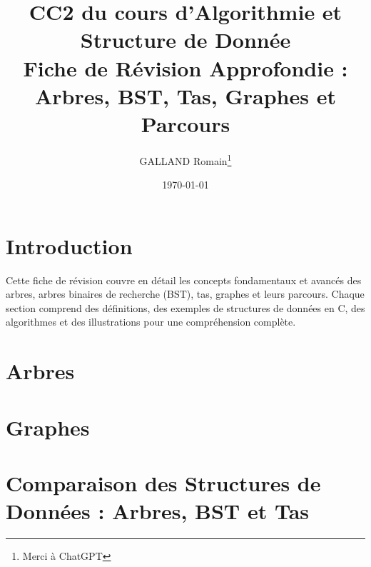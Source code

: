 \documentclass{article}
\title{CC2 du cours d'Algorithmie et Structure de Donnée \\ Fiche de Révision Approfondie : Arbres, BST, Tas, Graphes et Parcours}
\author{GALLAND Romain\thanks{Merci à ChatGPT}}
\date{\today}
\begin{document}
\maketitle
\newpage
{}
\tableofcontents
\newpage
\section*{Introduction}
Cette fiche de révision couvre en détail les concepts fondamentaux et avancés des arbres, arbres binaires de recherche (BST), tas, graphes et leurs parcours.
Chaque section comprend des définitions, des exemples de structures de données en C, des algorithmes et des illustrations pour une compréhension complète.

\section{Arbres}\label{sec:arbres}


\section{Graphes}\label{sec:graphes}


\section{Comparaison des Structures de Données : Arbres, BST et Tas}\label{sec:comparaison-structures-donnees}

\end{document}
